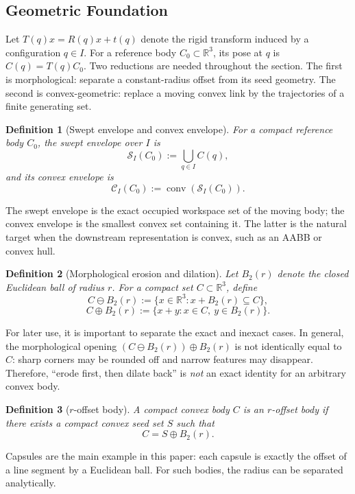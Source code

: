 \documentclass[journal]{IEEEtran}
\newtheorem{definition}{Definition}
\newcommand{\Real}{\ensuremath{\mathbb{R}}}
\begin{document}
\subsection{Geometric Foundation}\label{sec:rewrite_geom}

Let $T(q)x = R(q)x + t(q)$ denote the rigid transform induced by a
configuration $q \in I$. For a reference body $C_0 \subset \Real^3$, its pose at
$q$ is $C(q)=T(q)C_0$. Two reductions are needed throughout the section. The
first is morphological: separate a constant-radius offset from its seed
geometry. The second is convex-geometric: replace a moving convex link by the
trajectories of a finite generating set.

\begin{definition}[Swept envelope and convex envelope]
For a compact reference body $C_0$, the swept envelope over $I$ is
\[
\mathcal{S}_I(C_0) := \bigcup_{q\in I} C(q),
\]
and its convex envelope is
\[
\mathcal{C}_I(C_0) := \operatorname{conv}(\mathcal{S}_I(C_0)).
\]
\end{definition}

The swept envelope is the exact occupied workspace set of the moving body; the
convex envelope is the smallest convex set containing it. The latter is the
natural target when the downstream representation is convex, such as an AABB or
convex hull.

\begin{definition}[Morphological erosion and dilation]
Let $B_2(r)$ denote the closed Euclidean ball of radius $r$. For a compact set
$C \subset \Real^3$, define
\[
C \ominus B_2(r) := \{x \in \Real^3 : x + B_2(r) \subseteq C\},
\]
\[
C \oplus B_2(r) := \{x+y : x\in C,\ y\in B_2(r)\}.
\]
\end{definition}

For later use, it is important to separate the exact and inexact cases. In
general, the morphological opening $(C \ominus B_2(r)) \oplus B_2(r)$ is not
identically equal to $C$: sharp corners may be rounded off and narrow features
may disappear. Therefore, ``erode first, then dilate back'' is \emph{not} an
exact identity for an arbitrary convex body.

\begin{definition}[$r$-offset body]
A compact convex body $C$ is an $r$-offset body if there exists a compact convex
seed set $S$ such that
\[
C = S \oplus B_2(r).
\]
\end{definition}

Capsules are the main example in this paper: each capsule is exactly the offset
of a line segment by a Euclidean ball. For such bodies, the radius can be
separated analytically.
\end{document}
